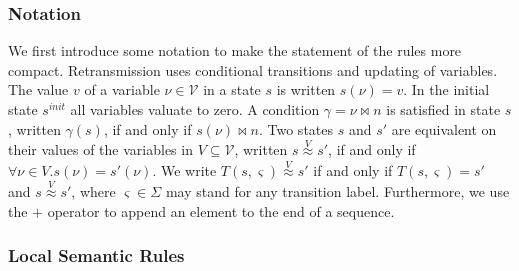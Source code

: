 \documentclass{sig-alternate}
\newcommand{\condition}{\gamma}
\renewcommand{\d}{\delta}
\newcommand{\M}{\mathcal{M}}
\newcommand{\V}{\mathcal{V}}
\newcommand{\vareq}[1]{\overset{#1}{\approx}}
\begin{document}
\subsubsection{Notation}

\newcommand{\smallstep}[2]{\xrightarrow{\hspace{0.3cm}{#1}\hspace{0.3cm}}_{M_{#2}}}
\newcommand{\bigstep}[1]{\xRightarrow{\hspace{0.3cm}{#1}\hspace{0.3cm}}_{\M(\d)}}



We first introduce some notation to make the statement of the rules more compact. Retransmission uses conditional transitions and updating of variables. The value $v$ of a variable $\nu \in \V$ in a state $s$ is written $s(\nu) = v$. In the initial state $s^{init}$ all variables valuate to zero. A condition $\condition = \nu \bowtie n$ is satisfied in state $s$, written $\condition(s)$, if and only if $s(\nu) \bowtie n$. Two states $s$ and $s'$ are equivalent on their values of the variables in $V \subseteq \V$, written $s \vareq{V} s'$, if and only if $\forall \nu \in V . s(\nu) = s'(\nu)$. We write $T(s, \varsigma) \vareq{V} s'$ if and only if $T(s, \varsigma) = s'$ and $s \vareq{V} s'$, where $\varsigma \in \Sigma$ may stand for any transition label. Furthermore, we use the $+$ operator to append an element to the end of a sequence.


\subsubsection{Local Semantic Rules}

\newcommand{\lsp}{3.7ex}
\end{document}
